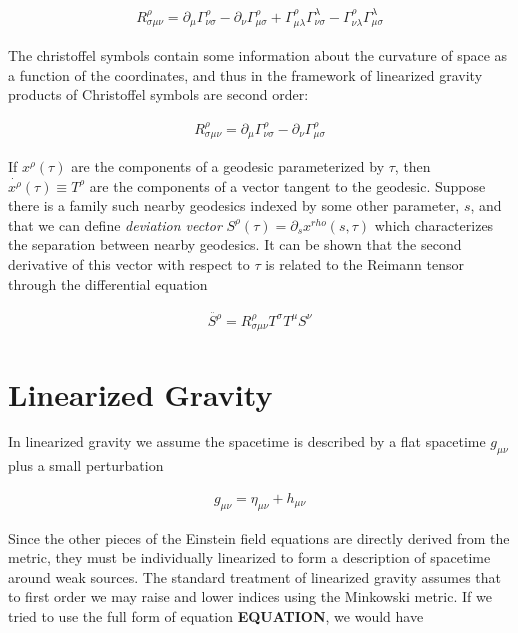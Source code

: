 \documentclass[paper=a4, fontsize=11pt]{scrartcl} %
\numberwithin{equation}{section} %
\numberwithin{figure}{section} %
\numberwithin{table}{section} %
\begin{document}
\begin{align}
R^{\rho}_{\sigma \mu \nu} = \partial_{\mu}\Gamma^{\rho}_{\nu \sigma} - \partial_{\nu}\Gamma^{\rho}_{\mu \sigma} + \Gamma^{\rho}_{\mu \lambda}\Gamma^{\lambda}_{\nu \sigma} - \Gamma^{\rho}_{\nu \lambda}\Gamma^{\lambda}_{\mu \sigma}
\end{align}

The christoffel symbols contain some information about the curvature of space as a function of the coordinates, and thus in the framework of linearized gravity products of Christoffel symbols are second order:   

\begin{align}
R^{\rho}_{\sigma \mu \nu} = \partial_{\mu}\Gamma^{\rho}_{\nu \sigma} - \partial_{\nu}\Gamma^{\rho}_{\mu \sigma} 
\end{align}




If $x^{\rho}(\tau)$ are the components of a geodesic parameterized by $\tau$, then $\dot{x^{\rho}}(\tau) \equiv T^{\rho}$ are the components of a vector tangent to the geodesic. Suppose there is a family such nearby geodesics indexed by some other parameter, $s$, and that we can define \textit{deviation vector} $S^{\rho}(\tau) = \partial_{s}x^{rho}(s,\tau)$ which characterizes the separation between nearby geodesics. It can be shown that the second derivative of this vector with respect to $\tau$ is related to the Reimann tensor through the differential equation
 

\begin{align}
\ddot{S^{\rho}} = R^{\rho}_{\sigma \mu \nu} T^{\sigma} T^{\mu} S^{\nu}
\end{align} 

\section{Linearized Gravity}

In linearized gravity we assume the spacetime is described by a flat spacetime $g_{\mu \nu}$ plus a small perturbation

\begin{align}
g_{\mu \nu} = \eta_{\mu \nu} + h_{\mu \nu}
\end{align}

Since the other pieces of the Einstein field equations are directly derived from the metric, they must be individually linearized to form a description of spacetime around weak sources. The standard treatment of linearized gravity assumes that to first order we may raise and lower indices using the Minkowski metric. If we tried to use the full form of equation \textbf{EQUATION}, we would have
\end{document}
